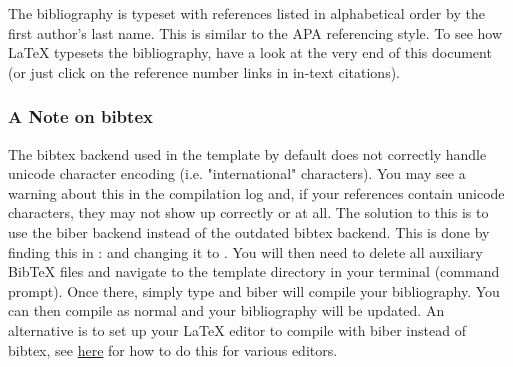 The bibliography is typeset with references listed in alphabetical order by the first author's last name. This is similar to the APA referencing style. To see how \LaTeX{} typesets the bibliography, have a look at the very end of this document (or just click on the reference number links in in-text citations).

\subsubsection{A Note on bibtex}

The bibtex backend used in the template by default does not correctly handle unicode character encoding (i.e. "international" characters). You may see a warning about this in the compilation log and, if your references contain unicode characters, they may not show up correctly or at all. The solution to this is to use the biber backend instead of the outdated bibtex backend. This is done by finding this in :  and changing it to . You will then need to delete all auxiliary BibTeX files and navigate to the template directory in your terminal (command prompt). Once there, simply type  and biber will compile your bibliography. You can then compile  as normal and your bibliography will be updated. An alternative is to set up your LaTeX editor to compile with biber instead of bibtex, see \href{http://tex.stackexchange.com/questions/154751/biblatex-with-biber-configuring-my-editor-to-avoid-undefined-citations/}{here} for how to do this for various editors.
